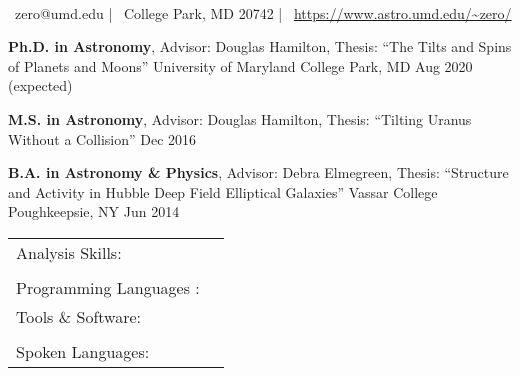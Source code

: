 \documentclass[]{awesome-cv}
\newcommand{\changeurlcolor}[1]{\hypersetup{urlcolor=#1}}
\begin{document}
    
\begin{center}
	  \\
	\vspace{2mm}
	{\faEnvelope\ zero@umd.edu} | {\faMapMarker\ College Park, MD 20742} | {\faLink\ \changeurlcolor{black}\href{https://www.astro.umd.edu/~zero/}{https://www.astro.umd.edu/\textasciitilde{}zero/}}
\end{center}
\begin{cventries}
	\cventry
	{\textbf{Ph.D. in Astronomy}, Advisor: Douglas Hamilton, Thesis: ``The Tilts and Spins of Planets and Moons''}
	{University of Maryland}
	{College Park, MD}
	{Aug 2020 (expected)}
	{}
	
	\vspace{-7mm}
	\cventry
	{\textbf{M.S. in Astronomy}, Advisor: Douglas Hamilton, Thesis: ``Tilting Uranus Without a Collision''}
	{}
	{}
	{Dec 2016}
	{}
	
	\vspace{-6mm}
	\cventry
	{\textbf{B.A. in Astronomy \& Physics}, Advisor: Debra Elmegreen, Thesis: ``Structure and Activity in	Hubble Deep Field Elliptical Galaxies''}
	{Vassar College}
	{Poughkeepsie, NY}
	{Jun 2014}
	{}
\end{cventries}

\vspace{-5mm}

\begin{cventries}
	\vspace{-3mm}
	\cventry
	{}
	{\def\arraystretch{1.15}{\begin{tabular}{ l l }
		Analysis Skills: & {\skill {Data Mining, Data Visualization, High Performance Computing,}}\\
		& {\skill {Multiprocessing, Statistics and Probability}} \\
		Programming Languages :  & {\skill{ Python, C, \LaTeX, Mathematica, shell scripting, HTML/CSS}} \\
		Tools \& Software:  & {\skill{ HDF5, Numpy, Matplotlib, Pandas, Scikit-learn, SciPy, Seaborn}} \\
		& {\skill{ Git, Jupyter Notebook, Microsoft Office, Slurm, Unix/Linux}} \\
		Spoken Languages:  & {\skill{ English (native), Hebrew (advanced)}} \\
		\end{tabular}}}
	{}
	{}
	{}
\end{cventries}
\end{document}

